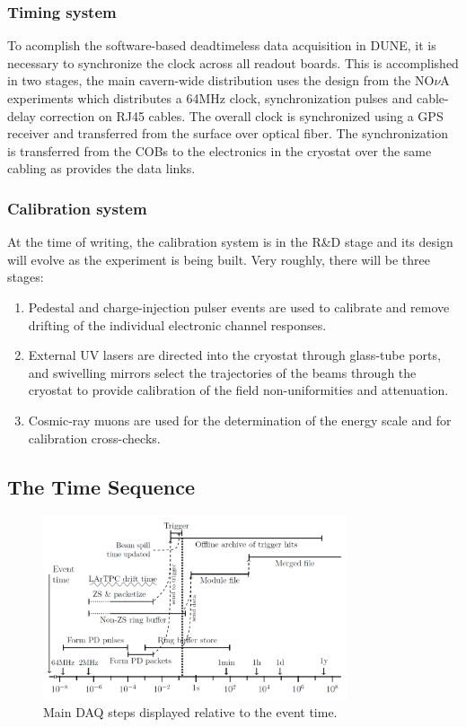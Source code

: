 \subsubsection{Timing system}
To acomplish the software-based deadtimeless data
acquisition in DUNE, it is necessary to synchronize the clock across
all readout boards.  This is accomplished in two stages, the main
cavern-wide distribution uses the design from the NO$\nu$A experiments
which distributes a 64MHz clock, synchronization pulses and
cable-delay correction on RJ45 cables.  The overall clock is
synchronized using a GPS receiver and transferred from the surface
over optical fiber.  The synchronization is transferred from the COBs
to the electronics in the cryostat over the same cabling as provides
the data links.

\subsubsection{Calibration system}
At the time of writing, the calibration system is in the R\&D stage and its design will
evolve as the experiment is being built. Very roughly, there will be three stages:
\begin{enumerate}

\item Pedestal and charge-injection pulser events are used to calibrate and
remove drifting of the individual electronic channel responses.

\item External UV lasers are directed into the cryostat through glass-tube
ports, and swivelling mirrors select the trajectories of the beams
through the cryostat to provide calibration of the field
non-uniformities and attenuation.

\item Cosmic-ray muons are used for the determination of the energy scale and for calibration
cross-checks.

\end{enumerate}



\subsection{The Time Sequence}
\begin{figure}[h!]
	\centering
	\includegraphics[width=0.8\textwidth]{daq-steps.png}
	\caption{Main DAQ steps displayed relative to the event time.}
	\label{fig:fddaqtime}
\end{figure}

